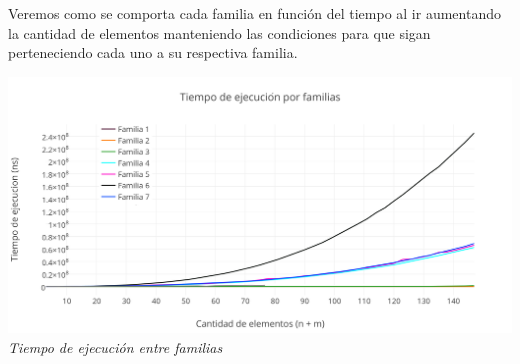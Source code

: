 Veremos como se comporta cada familia en funci\'on del tiempo al ir aumentando la cantidad de elementos manteniendo las condiciones para que sigan perteneciendo cada uno a su respectiva familia.

\vspace*{0.3cm} \vspace*{0.3cm}
  \begin{center}
\includegraphics[scale=0.60]{./EJ2/comparativo.png}
\\{\textit{Tiempo de ejecución entre familias}}
  \end{center}
  \vspace*{0.3cm}
  \begin{figure} [!ht]
 \centering
    \label{fig:comparativo1}
    \label{fig:comparativo2}
    \end{figure}

